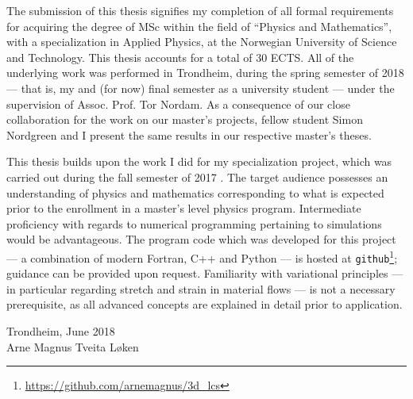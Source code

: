 The submission of this thesis signifies my completion of all formal
requirements for acquiring the degree of MSc within the field of ``Physics and
Mathematics'', with a specialization in Applied Physics, at the Norwegian
University of Science and Technology. This thesis accounts for a total of 30
ECTS. All of the underlying work was performed in Trondheim, during the spring
semester of 2018 --- that is, my  and (for now) final semester as a
university student --- under the supervision of Assoc. Prof. Tor Nordam. As a
consequence of our close collaboration for the work on our master's projects,
fellow student Simon Nordgreen and I present the same results in our respective
master's theses.

This thesis builds upon the work I did for my specialization project, which was
carried out during the fall semester of 2017 \parencite{loken2017sensitivity}.
The target audience possesses an understanding of physics and mathematics
corresponding to what is expected prior to the enrollment in a master's level
physics program. Intermediate proficiency with regards to numerical programming
pertaining to simulations would be advantageous. The program code which was
developed for this project --- a combination of modern Fortran, C++ and
Python --- is hosted at
\texttt{github}\footnote{\url{https://github.com/arnemagnus/3d_lcs}}; guidance
can be provided upon request. Familiarity with variational principles --- in
particular regarding stretch and strain in material flows --- is not a
necessary prerequisite, as all advanced concepts are explained in detail prior
to application.


\begin{minipage}[t]{\textwidth}
    \begin{flushright}
    Trondheim, June 2018\\
    Arne Magnus Tveita Løken
    \end{flushright}
\end{minipage}
